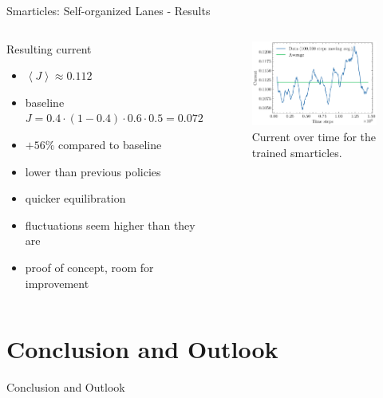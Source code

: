 \documentclass[10pt,xcolor=table, aspectratio=1610]{beamer}
\begin{document}
\begin{frame}{Smarticles: Self-organized Lanes - Results}
  \begin{columns}
    \begin{block}{Resulting current}
      \begin{itemize}
        \item $\left\langle J \right\rangle \approx 0.112$
        \item baseline $J=0.4\cdot(1-0.4)\cdot0.6\cdot0.5=0.072$
        \item $+56\%$ compared to baseline
        \item lower than previous policies
        \item quicker equilibration
        \item fluctuations seem higher than they are
        \item proof of concept, room for improvement
      \end{itemize}
    \end{block}
    \begin{figure}
        \includegraphics[width=\textwidth]{../Thesis/img/results/lanes_current.pdf}
        \caption*{Current over time for the trained smarticles.}
      \end{figure}
  \end{columns}
\end{frame}

\section{Conclusion and Outlook}
\begin{frame}{Conclusion and Outlook}

\end{frame}
\end{document}

